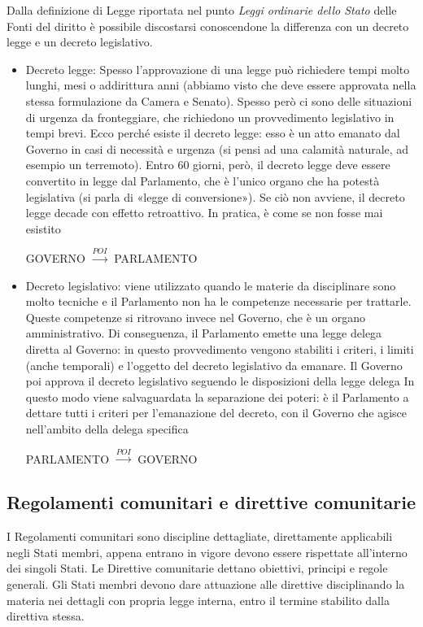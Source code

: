 Dalla definizione di Legge riportata nel punto \emph{Leggi ordinarie dello Stato} delle Fonti 
del diritto è possibile discostarsi conoscendone la differenza con un decreto legge e un decreto
legislativo.
\begin{itemize}
    \item Decreto legge: Spesso l’approvazione di una legge può richiedere tempi molto lunghi, mesi
        o addirittura anni (abbiamo visto che deve essere approvata nella stessa formulazione da Camera
        e Senato). Spesso però ci sono delle situazioni di urgenza da fronteggiare, che richiedono un 
        provvedimento legislativo in tempi brevi. Ecco perché esiste il decreto legge: esso è un atto
        emanato dal Governo in casi di necessità e urgenza (si pensi ad una calamità naturale, ad esempio 
        un terremoto). Entro 60 giorni, però, il decreto legge deve essere convertito in legge dal Parlamento, 
        che è l’unico organo che ha potestà legislativa (si parla di «legge di conversione»). Se ciò non 
        avviene, il decreto legge decade con effetto retroattivo. In pratica, è come se non fosse mai esistito
        \begin{center}
            GOVERNO $\xrightarrow{POI}$ PARLAMENTO
        \end{center}
    \item Decreto legislativo: viene utilizzato quando le materie da disciplinare sono molto tecniche e il 
        Parlamento non ha le competenze necessarie per trattarle. Queste competenze si ritrovano invece nel Governo, 
        che è un organo amministrativo. \newline
        Di conseguenza, il Parlamento emette una legge delega diretta al Governo: in questo provvedimento vengono 
        stabiliti i criteri, i limiti (anche temporali) e l’oggetto del decreto legislativo da emanare. Il Governo poi 
        approva il decreto legislativo seguendo le disposizioni della legge delega
        In questo modo viene salvaguardata la separazione dei poteri: è il Parlamento a dettare tutti i criteri per l’emanazione
        del decreto, con il Governo che agisce nell'ambito della delega specifica
        \begin{center}
            PARLAMENTO $\xrightarrow{POI}$ GOVERNO
        \end{center}
\end{itemize}

\subsection{Regolamenti comunitari e direttive comunitarie}
I Regolamenti comunitari sono discipline dettagliate, direttamente applicabili negli Stati membri, appena
entrano in vigore devono essere rispettate all'interno dei singoli Stati. \newline
Le Direttive comunitarie dettano obiettivi, principi e regole generali. Gli Stati membri devono dare attuazione
alle direttive disciplinando la materia nei dettagli con propria legge interna, entro il termine stabilito dalla
direttiva stessa.
